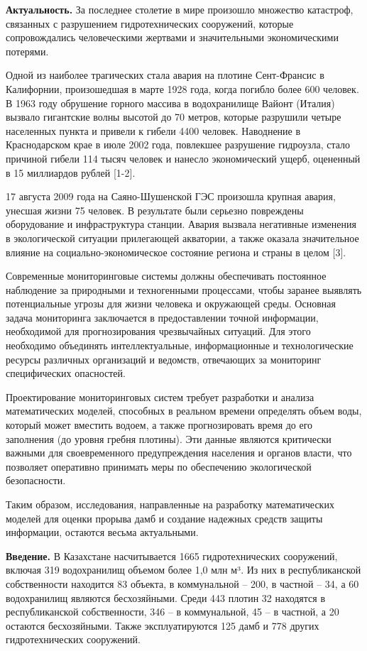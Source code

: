 \begin{multicols}{2}
{\bfseries Актуальность.} За последнее столетие в мире произошло множество
катастроф, связанных с разрушением гидротехнических сооружений, которые
сопровождались человеческими жертвами и значительными экономическими
потерями.

Одной из наиболее трагических стала авария на плотине Сент-Франсис в
Калифорнии, произошедшая в марте 1928 года, когда погибло более 600
человек. В 1963 году обрушение горного массива в водохранилище Вайонт
(Италия) вызвало гигантские волны высотой до 70 метров, которые
разрушили четыре населенных пункта и привели к гибели 4400 человек.
Наводнение в Краснодарском крае в июле 2002 года, повлекшее разрушение
гидроузла, стало причиной гибели 114 тысяч человек и нанесло
экономический ущерб, оцененный в 15 миллиардов рублей {[}1-2{]}.

17 августа 2009 года на Саяно-Шушенской ГЭС произошла крупная авария,
унесшая жизни 75 человек. В результате были серьезно повреждены
оборудование и инфраструктура станции. Авария вызвала негативные
изменения в экологической ситуации прилегающей акватории, а также
оказала значительное влияние на социально-экономическое состояние
региона и страны в целом {[}3{]}.

Современные мониторинговые системы должны обеспечивать постоянное
наблюдение за природными и техногенными процессами, чтобы заранее
выявлять потенциальные угрозы для жизни человека и окружающей среды.
Основная задача мониторинга заключается в предоставлении точной
информации, необходимой для прогнозирования чрезвычайных ситуаций. Для
этого необходимо объединять интеллектуальные, информационные и
технологические ресурсы различных организаций и ведомств, отвечающих за
мониторинг специфических опасностей.

Проектирование мониторинговых систем требует разработки и анализа
математических моделей, способных в реальном времени определять объем
воды, который может вместить водоем, а также прогнозировать время до его
заполнения (до уровня гребня плотины). Эти данные являются критически
важными для своевременного предупреждения населения и органов власти,
что позволяет оперативно принимать меры по обеспечению экологической
безопасности.

Таким образом, исследования, направленные на разработку математических
моделей для оценки прорыва дамб и создание надежных средств защиты
информации, остаются весьма актуальными.

{\bfseries Введение.} В Казахстане насчитывается 1665 гидротехнических
сооружений, включая 319 водохранилищ объемом более 1,0 млн м³. Из них в
республиканской собственности находится 83 объекта, в коммунальной --
200, в частной -- 34, а 60 водохранилищ являются бесхозяйными. Среди 443
плотин 32 находятся в республиканской собственности, 346 -- в
коммунальной, 45 -- в частной, а 20 остаются бесхозяйными. Также
эксплуатируются 125 дамб и 778 других гидротехнических сооружений.


\end{multicols}
